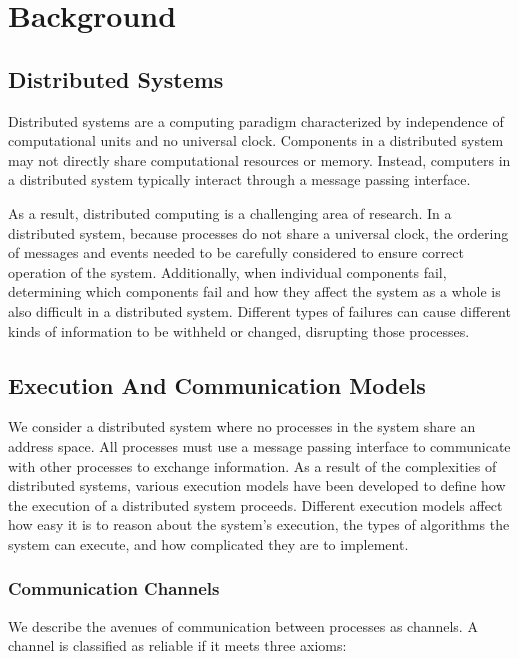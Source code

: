 \chapter{Background}

\section{Distributed Systems}

Distributed systems are a computing paradigm characterized by independence of computational units and no universal clock.
Components in a distributed system may not directly share computational resources or memory.
Instead, computers in a distributed system typically interact through a message passing interface.

As a result, distributed computing is a challenging area of research.
In a distributed system, because processes do not share a universal clock, the ordering of messages and events needed to be carefully considered to ensure correct operation of the system.
Additionally, when individual components fail, determining which components fail and how they affect the system as a whole is also difficult in a distributed system.
Different types of failures can cause different kinds of information to be withheld or changed, disrupting those processes.

\section{Execution And Communication Models}

We consider a distributed system where no processes in the system share an address space.
All processes must use a message passing interface to communicate with other processes to exchange information.
As a result of the complexities of distributed systems, various execution models have been developed to define how the execution of a distributed system proceeds.
Different execution models affect how easy it is to reason about the system's execution, the types of algorithms the system can execute, and how complicated they are to implement.

\subsection{Communication Channels}
We describe the avenues of communication between processes as channels.
A channel is classified as reliable if it meets three axioms:

